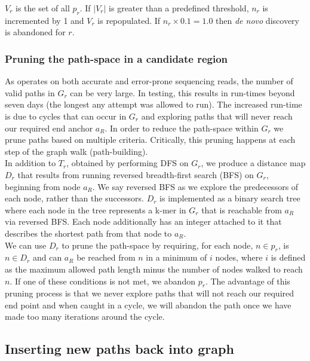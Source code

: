 $V_r$ is the set of all $p_r$. If $|V_r|$ is greater than a predefined threshold, $n_r$ is incremented by 1 and $V_r$ is repopulated. If $n_r \times 0.1 = 1.0$ then \textit{de novo} discovery is abandoned for $r$.

\subsubsection{Pruning the path-space in a candidate region}

As \pandora{} operates on both accurate and error-prone sequencing reads, the number of valid paths in $G_r$ can be very large. In testing, this results in run-times beyond seven days (the longest any attempt was allowed to run). The increased run-time is due to cycles that can occur in $G_r$ and exploring paths that will never reach our required end anchor $a_R$. In order to reduce the path-space within $G_r$ we prune paths based on multiple criteria. Critically, this pruning happens at each step of the graph walk (path-building).\\
In addition to $T_r$, obtained by performing DFS on $G_r$, we produce a distance map $D_r$ that results from running reversed breadth-first search (BFS) on $G_r$, beginning from node $a_R$. We say reversed BFS as we explore the predecessors of each node, rather than the successors. $D_r$ is implemented as a binary search tree where each node in the tree represents a k-mer in $G_r$ that is reachable from $a_R$ via reversed BFS. Each node additionally has an integer attached to it that describes the shortest path from that node to $a_R$.\\
We can use $D_r$ to prune the path-space by requiring, for each node, $n \in p_r$, is $n \in D_r$ and can $a_R$ be reached from $n$ in a minimum of $i$ nodes, where $i$ is defined as the maximum allowed path length minus the number of nodes walked to reach $n$. If one of these conditions is not met, we abandon $p_r$. The advantage of this pruning process is that we never explore paths that will not reach our required end point and when caught in a cycle, we will abandon the path once we have made too many iterations around the cycle.

\subsection{Inserting new paths back into graph}

